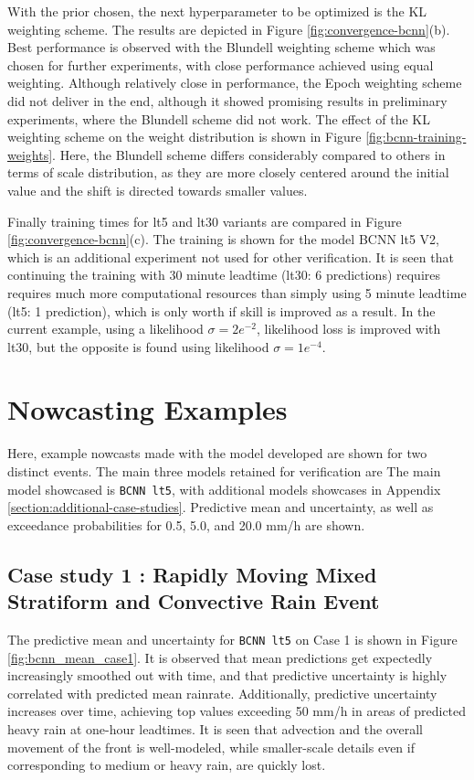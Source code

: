 With the prior chosen, the next hyperparameter to be optimized is the KL weighting scheme. The results are depicted in Figure \ref{fig:convergence-bcnn}(b). Best performance is observed with the Blundell weighting scheme which was chosen for further experiments, with close performance achieved using equal weighting. Although relatively close in performance, the Epoch weighting scheme did not deliver in the end, although it showed promising results in preliminary experiments, where the Blundell scheme did not work. The effect of the KL weighting scheme on the weight distribution is shown in Figure \ref{fig:bcnn-training-weights}. Here, the Blundell scheme differs considerably compared to others in terms of scale distribution, as they are more closely centered around the initial value and the shift is directed towards smaller values. 

Finally training times for lt5 and lt30 variants are compared in Figure \ref{fig:convergence-bcnn}(c). The training is shown for the model BCNN lt5 V2, which is an additional experiment not used for other verification. It is seen that continuing the training with 30 minute leadtime (lt30: 6 predictions) requires requires much more computational resources than simply using 5 minute leadtime (lt5: 1 prediction), which is only worth if skill is improved as a result. In the current example, using a likelihood $\sigma = 2e^{-2}$, likelihood loss is improved with lt30, but the opposite is found using likelihood $\sigma = 1e^{-4}$.

\section{Nowcasting Examples}

Here, example nowcasts made with the model developed are shown for two distinct events. The main three models retained for verification are The main model showcased is \texttt{BCNN lt5}, with additional models showcases in Appendix \ref{section:additional-case-studies}.  Predictive mean and uncertainty, as well as exceedance probabilities for 0.5, 5.0, and 20.0 mm/h are shown.  

\subsection{Case study 1 : Rapidly Moving Mixed Stratiform and Convective Rain Event}

The predictive mean and uncertainty for \texttt{BCNN lt5} on Case 1 is shown in Figure \ref{fig:bcnn_mean_case1}. It is observed that mean predictions get expectedly increasingly smoothed out with time, and that predictive uncertainty is highly correlated with predicted mean rainrate. Additionally, predictive uncertainty increases over time, achieving top values exceeding 50 mm/h in areas of predicted heavy rain at one-hour leadtimes. It is seen that advection and the overall movement of the front is well-modeled, while smaller-scale details even if corresponding to medium or heavy rain, are quickly lost. 

